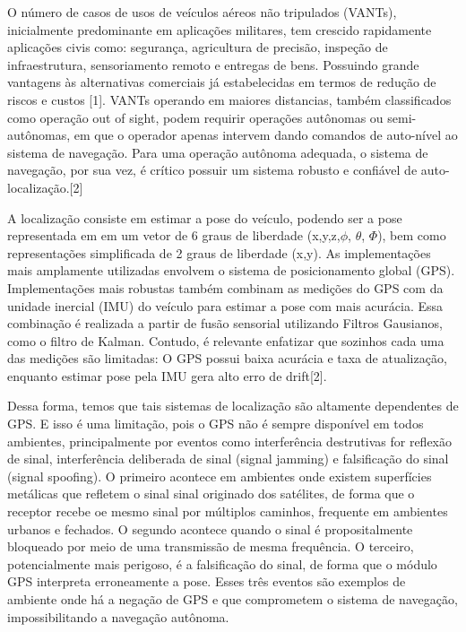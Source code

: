 O número de casos de usos de veículos aéreos não tripulados (VANTs), inicialmente predominante em aplicações militares, tem crescido rapidamente aplicações civis como: segurança, agricultura de precisão, inspeção de infraestrutura, sensoriamento remoto e entregas de bens. Possuindo grande vantagens às alternativas comerciais já estabelecidas em termos de redução de riscos e custos [1]. VANTs operando em maiores distancias, também classificados como operação out of sight, podem requirir operações autônomas ou semi-autônomas, em que o operador apenas intervem dando comandos de auto-nível ao sistema de navegação. Para uma operação autônoma adequada, o sistema de navegação, por sua vez, é crítico possuir um sistema robusto e confiável de auto-localização.[2]

A localização consiste em estimar a pose do veículo, podendo ser a pose representada em em um vetor de 6 graus de liberdade (x,y,z,$\phi$, $\theta$, $\Phi$), bem como representações simplificada de 2 graus de liberdade (x,y).
As implementações mais amplamente utilizadas envolvem o sistema de posicionamento global (GPS). Implementações mais robustas também combinam as medições do GPS com da unidade inercial (IMU) do veículo para estimar a pose com mais acurácia. Essa combinação é realizada a partir de fusão sensorial utilizando Filtros Gausianos, como o filtro de Kalman. Contudo, é relevante enfatizar que sozinhos cada uma das medições são limitadas: O GPS possui baixa acurácia e taxa de atualização, enquanto estimar pose pela IMU gera alto erro de drift[2].

Dessa forma, temos que tais sistemas de localização são altamente dependentes de GPS. E isso é uma limitação, pois o GPS não é sempre disponível em todos ambientes, principalmente por eventos como interferência destrutivas for reflexão de sinal, interferência deliberada de sinal (signal jamming) e falsificação do sinal (signal spoofing).
O primeiro acontece em ambientes onde existem superfícies metálicas que refletem o sinal sinal originado dos satélites, de forma que o receptor recebe oe mesmo sinal por múltiplos caminhos, frequente em ambientes urbanos e fechados. O segundo acontece quando o sinal é propositalmente bloqueado por meio de uma transmissão de mesma frequência. O terceiro, potencialmente mais perigoso, é a falsificação do sinal, de forma que o módulo GPS interpreta erroneamente a pose. Esses três eventos são exemplos de ambiente onde há a negação de GPS e que comprometem o sistema de navegação, impossibilitando a navegação autônoma.

